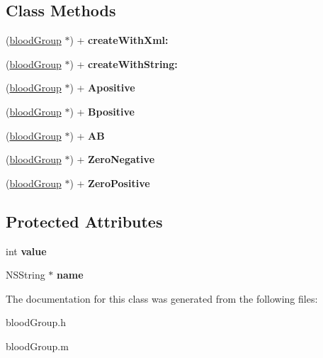 \subsection*{Class Methods}
\begin{DoxyCompactItemize}
\item 
\hypertarget{interfaceblood_group_af5e3c62b40a297c54dd43ffbb10a72eb}{}(\hyperlink{interfaceblood_group}{blood\+Group} $\ast$) + {\bfseries create\+With\+Xml\+:}\label{interfaceblood_group_af5e3c62b40a297c54dd43ffbb10a72eb}

\item 
\hypertarget{interfaceblood_group_a6ee6d828b8cd7c2997ee79b6aeb8b8d6}{}(\hyperlink{interfaceblood_group}{blood\+Group} $\ast$) + {\bfseries create\+With\+String\+:}\label{interfaceblood_group_a6ee6d828b8cd7c2997ee79b6aeb8b8d6}

\item 
\hypertarget{interfaceblood_group_a5a92093503eddb0c7ab96d62b4323800}{}(\hyperlink{interfaceblood_group}{blood\+Group} $\ast$) + {\bfseries Apositive}\label{interfaceblood_group_a5a92093503eddb0c7ab96d62b4323800}

\item 
\hypertarget{interfaceblood_group_a04ebaf377e9554b8f4344e1cd5a40d4a}{}(\hyperlink{interfaceblood_group}{blood\+Group} $\ast$) + {\bfseries Bpositive}\label{interfaceblood_group_a04ebaf377e9554b8f4344e1cd5a40d4a}

\item 
\hypertarget{interfaceblood_group_a6e2231ab8cfb80df023c9024e6821de0}{}(\hyperlink{interfaceblood_group}{blood\+Group} $\ast$) + {\bfseries A\+B}\label{interfaceblood_group_a6e2231ab8cfb80df023c9024e6821de0}

\item 
\hypertarget{interfaceblood_group_adf547881573bc4f46dc4007ebb22b7f1}{}(\hyperlink{interfaceblood_group}{blood\+Group} $\ast$) + {\bfseries Zero\+Negative}\label{interfaceblood_group_adf547881573bc4f46dc4007ebb22b7f1}

\item 
\hypertarget{interfaceblood_group_af5a6f967465e58a35a9b4530fe3874c8}{}(\hyperlink{interfaceblood_group}{blood\+Group} $\ast$) + {\bfseries Zero\+Positive}\label{interfaceblood_group_af5a6f967465e58a35a9b4530fe3874c8}

\end{DoxyCompactItemize}
\subsection*{Protected Attributes}
\begin{DoxyCompactItemize}
\item 
\hypertarget{interfaceblood_group_a6b1583d090aca6d94a3ca97b76dd0108}{}int {\bfseries value}\label{interfaceblood_group_a6b1583d090aca6d94a3ca97b76dd0108}

\item 
\hypertarget{interfaceblood_group_a093507463624da5a4a5fcd4d9c273dc5}{}N\+S\+String $\ast$ {\bfseries name}\label{interfaceblood_group_a093507463624da5a4a5fcd4d9c273dc5}

\end{DoxyCompactItemize}


The documentation for this class was generated from the following files\+:\begin{DoxyCompactItemize}
\item 
blood\+Group.\+h\item 
blood\+Group.\+m\end{DoxyCompactItemize}
